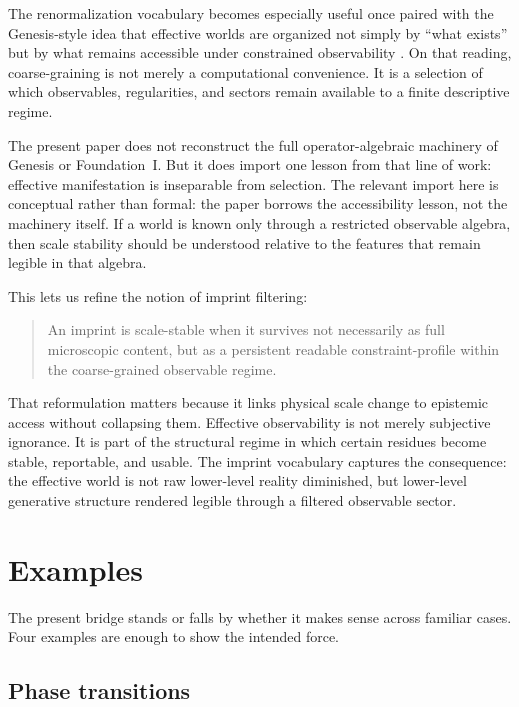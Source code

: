 \documentclass[12pt,a4paper]{article}
\begin{document}
The renormalization vocabulary becomes especially useful once paired with the Genesis-style idea that effective worlds are organized not simply by ``what exists'' but by what remains accessible under constrained observability \cite{HAFFA,FoundationI}. On that reading, coarse-graining is not merely a computational convenience. It is a selection of which observables, regularities, and sectors remain available to a finite descriptive regime.

The present paper does not reconstruct the full operator-algebraic machinery of Genesis or Foundation~I. But it does import one lesson from that line of work: effective manifestation is inseparable from selection. The relevant import here is conceptual rather than formal: the paper borrows the accessibility lesson, not the machinery itself. If a world is known only through a restricted observable algebra, then scale stability should be understood relative to the features that remain legible in that algebra.

This lets us refine the notion of imprint filtering:

\begin{quote}
An imprint is scale-stable when it survives not necessarily as full microscopic content, but as a persistent readable constraint-profile within the coarse-grained observable regime.
\end{quote}

That reformulation matters because it links physical scale change to epistemic access without collapsing them. Effective observability is not merely subjective ignorance. It is part of the structural regime in which certain residues become stable, reportable, and usable. The imprint vocabulary captures the consequence: the effective world is not raw lower-level reality diminished, but lower-level generative structure rendered legible through a filtered observable sector.

\section{Examples}

The present bridge stands or falls by whether it makes sense across familiar cases. Four examples are enough to show the intended force.

\subsection{Phase transitions}
\end{document}

